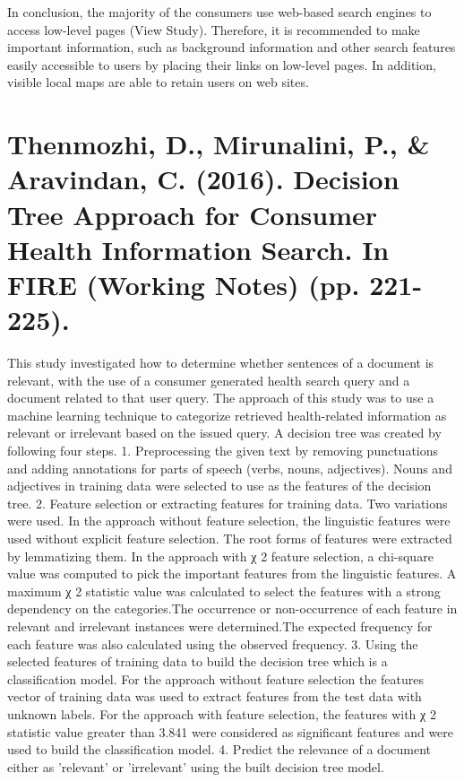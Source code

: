 \documentclass[]{article}
\begin{document}
In conclusion, the majority of the consumers use web-based search engines to access low-level pages (View Study). Therefore, it is recommended to make important information, such as background information and other search features easily accessible to users by placing their links on low-level pages. In addition, visible local maps are able to retain users on web sites.  

\section{Thenmozhi, D., Mirunalini, P., \& Aravindan, C. (2016). Decision Tree Approach for Consumer Health Information Search. In FIRE (Working Notes) (pp. 221-225).}

This study investigated how to determine whether sentences of a document is relevant, with the use of a consumer generated health search query and a document related to that user query. The approach of this study was to use a machine learning technique to categorize retrieved health-related information as relevant or irrelevant based on the issued query. A decision tree was created by following four steps. 1. Preprocessing the given text by removing punctuations and adding annotations for parts of speech (verbs, nouns, adjectives). Nouns and adjectives in training data were selected to use as the features of the decision tree. 2. Feature selection or extracting features for training data. Two variations were used. In the approach without feature selection, the linguistic features were used without explicit feature selection. The root forms of features were extracted by lemmatizing them. In the approach with χ 2 feature selection, a chi-square value was computed to pick the important features from the linguistic features. A maximum χ 2 statistic value was calculated to select the features with a strong dependency on the categories.The occurrence or non-occurrence of each feature in relevant and irrelevant instances were determined.The expected frequency for each feature was also calculated using the observed frequency. 3. Using the selected features of training data to build the decision tree which is a classification model. For the approach without feature selection the features vector of training data was used to extract features from the test data with unknown labels. For the approach with feature selection, the features with  χ 2 statistic value greater than 3.841 were considered as significant features and were used to build the classification model. 4. Predict the relevance of a document either as 'relevant' or 'irrelevant' using the built decision tree model. 
\end{document}
